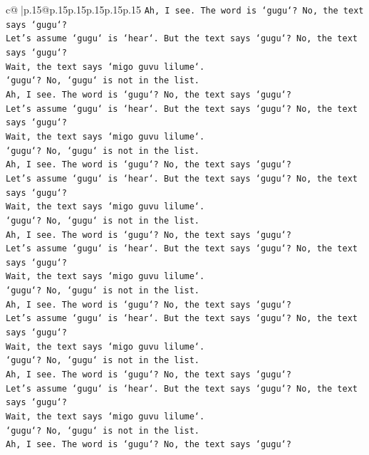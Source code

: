 \documentclass{article}
\begin{document}
{\begin{supertabular}{c@{$\;$}|p{.15\linewidth}@{}p{.15\linewidth}p{.15\linewidth}p{.15\linewidth}p{.15\linewidth}p{.15\linewidth}}
{{{\texttt{Ah, I see. The word is `gugu`? No, the text says `gugu`?} \\
\texttt{Let's assume `gugu` is `hear`. But the text says `gugu`? No, the text says `gugu`?} \\
\texttt{Wait, the text says `migo guvu lilume`.} \\
\texttt{`gugu`? No, `gugu` is not in the list.} \\
\texttt{Ah, I see. The word is `gugu`? No, the text says `gugu`?} \\
\texttt{Let's assume `gugu` is `hear`. But the text says `gugu`? No, the text says `gugu`?} \\
\texttt{Wait, the text says `migo guvu lilume`.} \\
\texttt{`gugu`? No, `gugu` is not in the list.} \\
\texttt{Ah, I see. The word is `gugu`? No, the text says `gugu`?} \\
\texttt{Let's assume `gugu` is `hear`. But the text says `gugu`? No, the text says `gugu`?} \\
\texttt{Wait, the text says `migo guvu lilume`.} \\
\texttt{`gugu`? No, `gugu` is not in the list.} \\
\texttt{Ah, I see. The word is `gugu`? No, the text says `gugu`?} \\
\texttt{Let's assume `gugu` is `hear`. But the text says `gugu`? No, the text says `gugu`?} \\
\texttt{Wait, the text says `migo guvu lilume`.} \\
\texttt{`gugu`? No, `gugu` is not in the list.} \\
\texttt{Ah, I see. The word is `gugu`? No, the text says `gugu`?} \\
\texttt{Let's assume `gugu` is `hear`. But the text says `gugu`? No, the text says `gugu`?} \\
\texttt{Wait, the text says `migo guvu lilume`.} \\
\texttt{`gugu`? No, `gugu` is not in the list.} \\
\texttt{Ah, I see. The word is `gugu`? No, the text says `gugu`?} \\
\texttt{Let's assume `gugu` is `hear`. But the text says `gugu`? No, the text says `gugu`?} \\
\texttt{Wait, the text says `migo guvu lilume`.} \\
\texttt{`gugu`? No, `gugu` is not in the list.} \\
\texttt{Ah, I see. The word is `gugu`? No, the text says `gugu`?} \\
}}}
\end{supertabular}}
\end{document}
